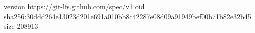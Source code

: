 version https://git-lfs.github.com/spec/v1
oid sha256:30ddd264e13023d201e691a010bb8c42287e08d09a91949bef00b71b82e32b45
size 208913
